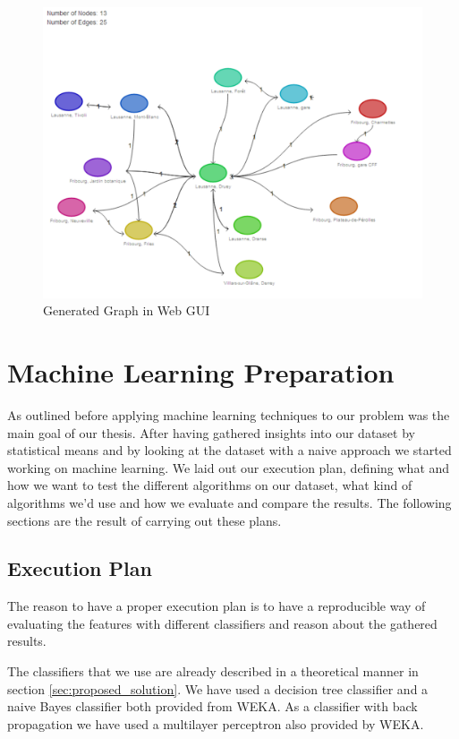 \begin{figure}[!ht]
	\centering
	\includegraphics[width=1.0\textwidth]{images/web-gui}
	\caption{Generated Graph in Web GUI}
	\label{figure:web_gui_graph}
\end{figure}

\section{Machine Learning Preparation}
\label{sec:machine_learning_results}
As outlined before applying machine learning techniques to our problem was the main goal of our thesis. After having gathered insights into our dataset by statistical means and by looking at the dataset with a naive approach we started working on machine learning. We laid out our execution plan, defining what and how we want to test the different algorithms on our dataset, what kind of algorithms we'd use and how we evaluate and compare the results. The following sections are the result of carrying out these plans.

\subsection{Execution Plan}
The reason to have a proper execution plan is to have a reproducible way of evaluating the features with different classifiers and reason about the gathered results. 

The classifiers that we use are already described in a theoretical manner in section \ref{sec:proposed_solution}. We have used a decision tree classifier and a naive Bayes classifier both provided from WEKA. As a classifier with back propagation we have used a multilayer perceptron also provided by WEKA.

